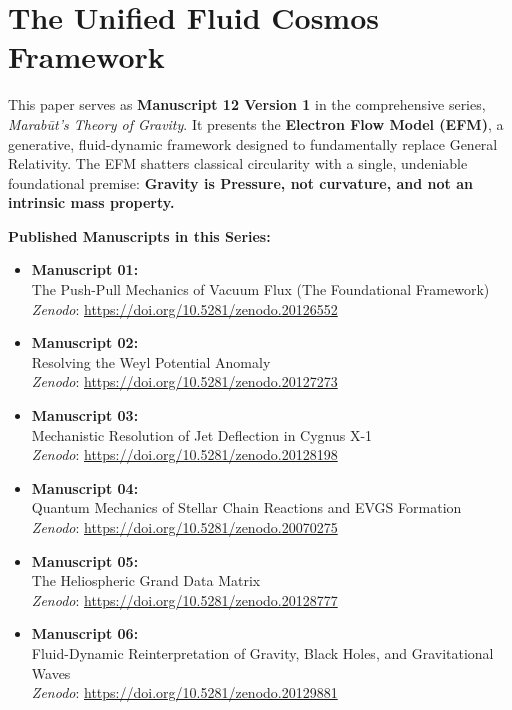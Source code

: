 \documentclass[11pt, a4paper, table]{article}
\begin{document}
\section*{The Unified Fluid Cosmos Framework}
  This paper serves as \textbf{Manuscript 12 Version 1} in the comprehensive series, \textit{Marab\={u}t's Theory of Gravity}. It presents the \textbf{Electron Flow Model (EFM)}, a generative, fluid-dynamic framework designed to fundamentally replace General Relativity. The EFM shatters classical circularity with a single, undeniable foundational premise: \textbf{Gravity is Pressure, not curvature, and not an intrinsic mass property.}

  \vspace{1em}
  \noindent \textbf{Published Manuscripts in this Series:}
  \begin{itemize}
    \item \textbf{Manuscript 01:} \\ The Push-Pull Mechanics of Vacuum Flux (The Foundational Framework) \\ \textit{Zenodo}: \url{https://doi.org/10.5281/zenodo.20126552}
    
    \item \textbf{Manuscript 02:} \\ Resolving the Weyl Potential Anomaly \\ \textit{Zenodo}: \url{https://doi.org/10.5281/zenodo.20127273}

    \item \textbf{Manuscript 03:} \\ Mechanistic Resolution of Jet Deflection in Cygnus X-1 \\ \textit{Zenodo}: \url{https://doi.org/10.5281/zenodo.20128198}

    \item \textbf{Manuscript 04:} \\ Quantum Mechanics of Stellar Chain Reactions and EVGS Formation \\ \textit{Zenodo}: \url{https://doi.org/10.5281/zenodo.20070275}

    \item \textbf{Manuscript 05:} \\ The Heliospheric Grand Data Matrix \\ \textit{Zenodo}: \url{https://doi.org/10.5281/zenodo.20128777}

    \item \textbf{Manuscript 06:} \\ Fluid-Dynamic Reinterpretation of Gravity, Black Holes, and Gravitational Waves \\ \textit{Zenodo}: \url{https://doi.org/10.5281/zenodo.20129881}


\end{itemize}
\end{document}

